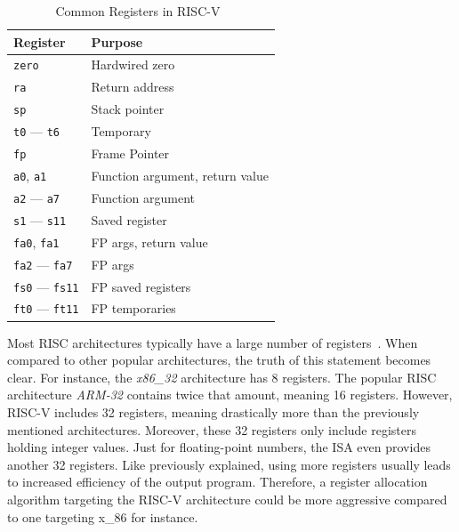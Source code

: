 \begin{table}
	\centering
	\caption{Common Registers in RISC-V~\cite[p~.155]{Waterman2019}}\label{tbl:riscv_regs}
	\begin{tabularx}{\linewidth}{l|L}
		 Register   & Purpose                         \\ \hline
		\texttt{zero}                 & Hardwired zero                  \\ \hline
		\texttt{ra}                   & Return address                  \\ \hline
		\texttt{sp}                   & Stack pointer                   \\ \hline
		\texttt{t0} —  \texttt{t6}    & Temporary                       \\ \hline
		\texttt{fp}                   & Frame Pointer                   \\ \hline
		\texttt{a0}, \texttt{a1}      & Function argument, return value \\ \hline
		\texttt{a2} — \texttt{a7}     & Function argument               \\ \hline
		\texttt{s1} — \texttt{s11}    & Saved register                  \\ \hline
		\texttt{fa0}, \texttt{fa1}    & FP args, return value           \\ \hline
		\texttt{fa2} — \texttt{fa7}   & FP args                         \\ \hline
		\texttt{fs0} — \texttt{fs11}  & FP saved registers              \\ \hline
		\texttt{ft0} —  \texttt{ft11} & FP temporaries                  \\
	\end{tabularx}
\end{table}

Most RISC architectures typically have a large number of registers~\cite[Chapter~2]{Dandamudi2005}.
When compared to other popular architectures, the truth of this statement becomes clear.
For instance, the \emph{x86\_32} architecture has 8 registers.
The popular RISC architecture \emph{ARM-32} contains twice that amount, meaning 16 registers.
However, RISC-V includes 32 registers, meaning drastically more than the previously mentioned architectures.
Moreover, these 32 registers only include registers holding integer values.
Just for floating-point numbers, the ISA even provides another 32 registers.
Like previously explained, using more registers usually leads to increased efficiency of the output program.
Therefore, a register allocation algorithm targeting the RISC-V architecture could be more aggressive compared to one targeting x\_86 for instance.

